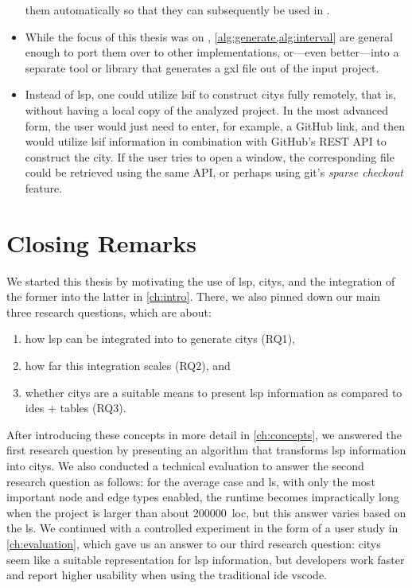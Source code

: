 \documentclass[../thesis]{subfiles}
\begin{document}
\begin{itemize}
{	      } them automatically so that they can subsequently be used in \SEE{}.
	\item While the focus of this thesis was on \SEE{}, \cref{alg:generate,alg:interval} are general enough to port them over to other  implementations, or---even better---into a separate tool or library that generates a \gls{gxl} file out of the input project.
	\item Instead of \gls{lsp}, one could utilize \gls{lsif} to construct \glspl{city} fully remotely, that is, without having a local copy of the analyzed project.
	      In the most advanced form, the user would just need to enter, for example, a GitHub link, and then \SEE{} would utilize \gls{lsif} information in combination with GitHub's REST API to construct the city.
	      If the user tries to open a \gls{window}, the corresponding file could be retrieved using the same API, or perhaps using git's \emph{sparse checkout} feature.
\end{itemize}

\section{Closing Remarks}
We started this thesis by motivating the use of \gls{lsp}, \glspl{city}, and the integration of the former into the latter in \cref{ch:intro}.
There, we also pinned down our main three research questions, which are about:
\begin{enumerate}
	\item how \gls{lsp} can be integrated into \SEE{} to generate \glspl{city} (\textsf{RQ1}),
	\item how far this integration scales (\textsf{RQ2}), and
	\item whether \glspl{city} are a suitable means to present \gls{lsp} information as compared to \glspl{ide} + tables (\textsf{RQ3}).
\end{enumerate}
After introducing these concepts in more detail in \cref{ch:concepts}, we answered the first research question by presenting an algorithm that transforms \gls{lsp} information into \glspl{city}.
We also conducted a technical evaluation to answer the second research question as follows: for the average case and \gls{ls}, with only the most important node and edge types enabled, the runtime becomes impractically long when the project is larger than about \qty{200000}{\gls{loc}}, but this answer varies based on the \gls{ls}.
We continued with a controlled experiment in the form of a user study in \cref{ch:evaluation}, which gave us an answer to our third research question:
\glspl{city} seem like a suitable representation for \gls{lsp} information, but developers work faster and report higher usability when using the traditional \gls{ide} \gls{vscode}.
\end{document}
